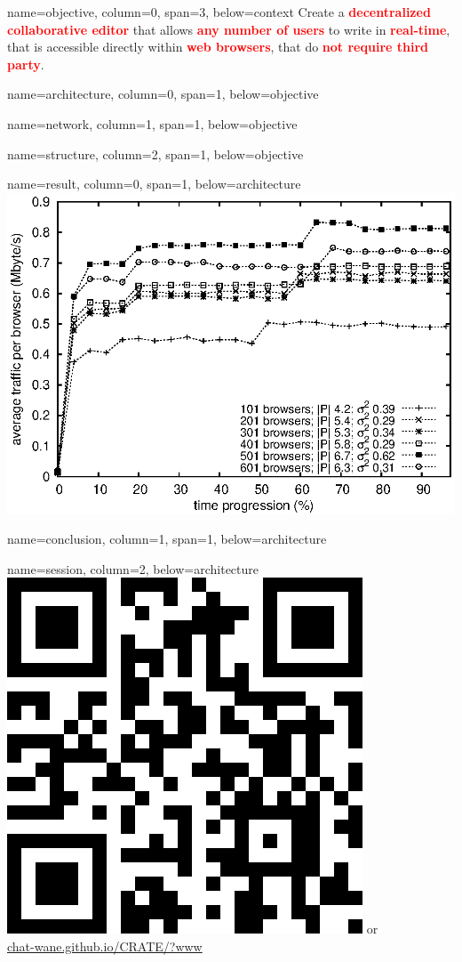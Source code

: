 \documentclass[a1paper, portrait]{baposter}
\newcommand{\BOLD}[1]{\textcolor{red}{\textbf{#1}}}
\begin{document}
\begin{poster}
  
  {name=objective, column=0, span=3, below=context} {
    Create a \BOLD{decentralized collaborative editor} that allows \BOLD{any number
      of users} to write in \BOLD{real-time}, that is accessible directly within
    \BOLD{web browsers}, that do \BOLD{not require third party}.
  }

  {name=architecture, column=0, span=1, below=objective}{
    
  }
  
  {name=network, column=1, span=1, below=objective}{
    
  }

  {name=structure, column=2, span=1, below=objective}{
    
  }

  {name=result, column=0, span=1, below=architecture}{
    \includegraphics[scale=0.4]{img/traffic.eps}
  }

  {name=conclusion, column=1, span=1, below=architecture}{
  }

  {name=session, column=2, below=architecture} {
    \centering
    \includegraphics[scale=0.25]{img/qrcode.png}
    or\\
    \url{chat-wane.github.io/CRATE/?www}
  }

\end{poster}
\end{document}
